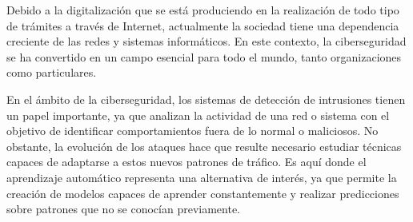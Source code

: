 Debido a la digitalización que se está produciendo en la realización de todo tipo de trámites a través de Internet, actualmente la sociedad tiene una dependencia creciente de las redes y sistemas informáticos. En este contexto, la ciberseguridad se ha convertido en un campo esencial para todo el mundo, tanto organizaciones como particulares.

En el ámbito de la ciberseguridad, los sistemas de detección de intrusiones tienen un papel importante, ya que analizan la actividad de una red o sistema con el objetivo de identificar comportamientos fuera de lo normal o maliciosos. No obstante, la evolución de los ataques hace que resulte necesario estudiar técnicas capaces de adaptarse a estos nuevos patrones de tráfico. Es aquí donde el aprendizaje automático representa una alternativa de interés, ya que permite la creación de modelos capaces de aprender constantemente y realizar predicciones sobre patrones que no se conocían previamente.